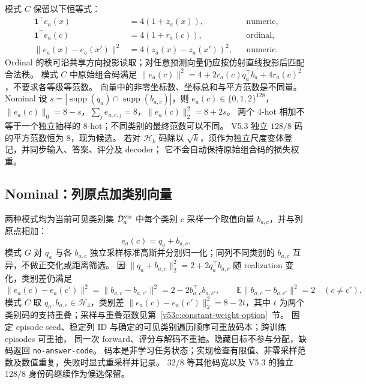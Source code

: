 \documentclass[11pt,UTF8,fontset=fandol]{ctexart}
\numberwithin{equation}{section}
\theoremstyle{definition}
\begin{document}
模式 $C$ 保留以下恒等式：
\begin{equation}
 \begin{aligned}
 \mathbf1^\top e_a(x)&=4(1+z_a(x)),&&\text{numeric},\\
 \mathbf1^\top e_a(c)&=4(1+r_a(c)),&&\text{ordinal},\\
 \|e_a(x)-e_a(x')\|^2&=4(z_a(x)-z_a(x'))^2,&&\text{numeric}.
 \end{aligned}
 \label{v53:eq:compositional-properties}
\end{equation}
Ordinal 的秩可沿共享方向投影读取；对任意预测向量仍应按仿射直线投影后匹配合法秩。
模式 $C$ 中原始组合码满足
$\|e_a(c)\|^2=4+2r_a(c)q_a^\top b_a+4r_a(c)^2$，不要求各等级等范数。
向量中的非零坐标数、坐标总和与平方范数是不同量。
Nominal 设 $s=|\operatorname{supp}(q_a)\cap\operatorname{supp}(b_{a,c})|$，则
$e_a(c)\in\{0,1,2\}^{128}$，$\|e_a(c)\|_0=8-s$，$\sum_j e_{a,c,j}=8$，$\|e_a(c)\|_2^2=8+2s$。
两个 4-hot 相加不等于一个独立抽样的 8-hot；不同类别的最终范数可以不同。
V5.3 独立 $128/8$ 码的平方范数恒为 $8$，现为候选。
若对 $\mathcal H_k$ 码除以 $\sqrt{k}$，须作为独立尺度变体登记，并同步输入、答案、评分及 decoder；
它不会自动保持原始组合码的损失权重。

\subsection{Nominal：列原点加类别向量}
两种模式均为当前可见类别集 $\mathcal D_a^{\rm vis}$ 中每个类别 $c$ 采样一个取值向量 $b_{a,c}$，并与列原点相加：
\begin{equation}
 \boxed{e_a(c)=q_a+b_{a,c}}.
 \label{v53c:eq:nominal-gaussian}
\end{equation}
模式 $G$ 对 $q_a$ 与各 $b_{a,c}$ 独立采样标准高斯并分别归一化；同列不同类别的 $b_{a,c}$ 互异，不做正交化或距离筛选。
因 $\|q_a+b_{a,c}\|_2^2=2+2q_a^\top b_{a,c}$ 随 realization 变化，类别差仍满足
\begin{equation}
 \|e_a(c)-e_a(c')\|^2
 =\|b_{a,c}-b_{a,c'}\|^2
 =2-2b_{a,c}^\top b_{a,c'},\qquad
 \mathbb E\|b_{a,c}-b_{a,c'}\|^2=2\quad(c\ne c').
 \label{v53c:eq:gaussian-code-geometry}
\end{equation}
模式 $C$ 取 $q_a,b_{a,c}\in\mathcal H_4$，类别差 $\|e_a(c)-e_a(c')\|_2^2=8-2t$，其中 $t$ 为两个类别码的支持重叠；采样与重叠范数见第~\ref{v53c:constant-weight-option}~节。
固定 episode seed、稳定列 ID 与确定的可见类别遍历顺序可重放码本；跨训练 episodes 可重抽，
同一次 forward、评分与解码不重抽。隐藏目标不参与分配，缺码返回 \texttt{no-answer-code}。
码本是非学习任务状态；实现检查有限值、非零采样范数及数值重复，失败时显式重采样并记录。
32/8 等其他码宽以及 V5.3 的独立 $128/8$ 身份码继续作为候选保留。
\end{document}
